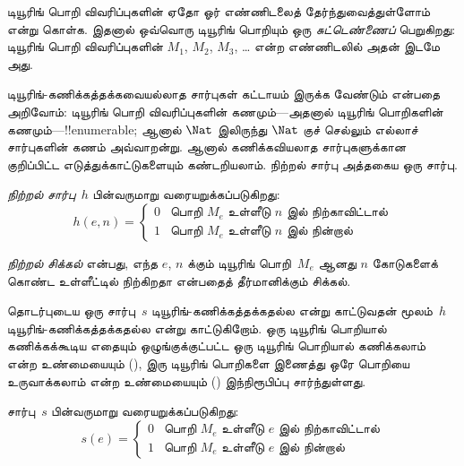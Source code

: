 \documentclass[../../../include/open-logic-section]{subfiles}
\begin{document}


\begin{explain}
டியூரிங் பொறி விவரிப்புகளின் ஏதோ ஓர் எண்ணிடலைத் தேர்ந்துவைத்துள்ளோம்
என்று கொள்க. இதனால் ஒவ்வொரு டியூரிங் பொறியும் ஒரு
\emph{சுட்டெண்ணைப்} பெறுகிறது: டியூரிங் பொறி விவரிப்புகளின்
$M_1$, $M_2$, $M_3$, \dots{} என்ற எண்ணிடலில் அதன் இடமே அது.

டியூரிங்-கணிக்கத்தக்கவையல்லாத சார்புகள் கட்டாயம் இருக்க வேண்டும்
என்பதை அறிவோம்: டியூரிங் பொறி விவரிப்புகளின் கணமும்---அதனால் டியூரிங்
பொறிகளின் கணமும்---!!{enumerable}; ஆனால் $\Nat$ இலிருந்து $\Nat$
குச் செல்லும் எல்லாச் சார்புகளின் கணம் அவ்வாறன்று. ஆனால்
கணிக்கவியலாத சார்புகளுக்கான குறிப்பிட்ட எடுத்துக்காட்டுகளையும்
கண்டறியலாம். நிற்றல் சார்பு அத்தகைய ஒரு சார்பு.
\end{explain}

\begin{defn}[நிற்றல் சார்பு]
 \emph{நிற்றல் சார்பு}~$h$ பின்வருமாறு வரையறுக்கப்படுகிறது:
\[
h(e,n) =
\begin{cases}
  \text{0} & \text{பொறி~$M_e$ உள்ளீடு $n$ இல் நிற்காவிட்டால்} \\
  \text{1} & \text{பொறி~$M_e$ உள்ளீடு $n$ இல் நின்றால்}
\end{cases}
\]
\end{defn}

\begin{defn}[நிற்றல் சிக்கல்]
\emph{நிற்றல் சிக்கல்} என்பது, எந்த $e$, $n$ க்கும் டியூரிங்
பொறி~$M_e$ ஆனது $n$ கோடுகளைக் கொண்ட உள்ளீட்டில் நிற்கிறதா என்பதைத்
தீர்மானிக்கும் சிக்கல்.
\end{defn}

\begin{explain}
தொடர்புடைய ஒரு சார்பு~$s$ டியூரிங்-கணிக்கத்தக்கதல்ல என்று காட்டுவதன்
மூலம்~$h$ டியூரிங்-கணிக்கத்தக்கதல்ல என்று காட்டுகிறோம். ஒரு டியூரிங்
பொறியால் கணிக்கக்கூடிய எதையும் ஒழுங்குக்குட்பட்ட ஒரு டியூரிங்
பொறியால் கணிக்கலாம் என்ற உண்மையையும் (), இரு
டியூரிங் பொறிகளை இணைத்து ஒரே பொறியை உருவாக்கலாம் என்ற உண்மையையும்
() இந்நிரூபிப்பு சார்ந்துள்ளது.
\end{explain}

\begin{defn} சார்பு~$s$ பின்வருமாறு வரையறுக்கப்படுகிறது:
\[
s(e) =
\begin{cases}
  \text{0} & \text{பொறி~$M_e$ உள்ளீடு $e$ இல் நிற்காவிட்டால்} \\
  \text{1} & \text{பொறி~$M_e$ உள்ளீடு $e$ இல் நின்றால்}
\end{cases}
\]
\end{defn}
\end{document}
